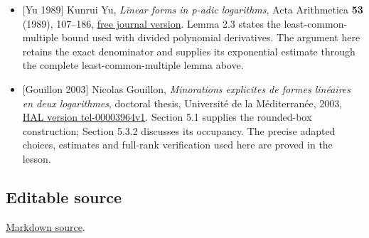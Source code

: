 \documentclass[
  11pt,
  a4paper,
]{article}
\begin{document}
\begin{itemize}
  \href{https://comptes-rendus.academie-sciences.fr/mathematique/item/10.1016/S1631-073X\%2802\%2902422-6.pdf}{free
  journal text}. This work develops the complete-intersection zero
  method, following David Masser; the degree, stabilizer and derivative
  arguments needed here are supplied in Section 15.
\item
  {[}Yu 1989{]} Kunrui Yu, \emph{Linear forms in p-adic logarithms},
  Acta Arithmetica \textbf{53} (1989), 107--186,
  \href{https://www.impan.pl/shop/publication/transaction/download/product/106168}{free
  journal version}. Lemma 2.3 states the least-common-multiple bound
  used with divided polynomial derivatives. The argument here retains
  the exact denominator and supplies its exponential estimate through
  the complete least-common-multiple lemma above.
\item
  {[}Gouillon 2003{]} Nicolas Gouillon, \emph{Minorations explicites de
  formes linéaires en deux logarithmes}, doctoral thesis, Université de
  la Méditerranée, 2003,
  \href{https://theses.hal.science/tel-00003964v1}{HAL version
  tel-00003964v1}. Section 5.1 supplies the rounded-box construction;
  Section 5.3.2 discusses its occupancy. The precise adapted choices,
  estimates and full-rank verification used here are proved in the
  lesson.
\end{itemize}

\subsection{Editable source}\label{editable-source}

\href{https://kokunoyumeto.github.io/open-math-courses-public/courses/TR-BAKER/src/TR-BAKER-07.md}{Markdown source}.
\end{document}

